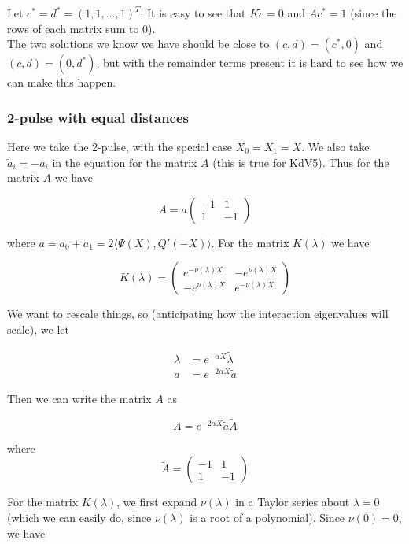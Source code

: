 \documentclass[12pt]{article}
\begin{document}
Let $c^* = d^* = (1, 1, \dots, 1)^T$. It is easy to see that $K \tilde{c} = 0$ and $A c^* = 1$ (since the rows of each matrix sum to 0).\\

The two solutions we know we have should be close to $(c, d) = (c^*, 0)$ and $(c, d) = (0, d^*)$, but with the remainder terms present it is hard to see how we can make this happen.

\subsubsection{2-pulse with equal distances}

Here we take the 2-pulse, with the special case $X_0 = X_1 = X$. We also take $\tilde{a}_i = -a_i$ in the equation for the matrix $A$ (this is true for KdV5). Thus for the matrix $A$ we have

\[
A = a \begin{pmatrix}
-1 & 1 \\
1 & -1
\end{pmatrix}
\]

where $a = a_0 + a_1 = 2 \langle \Psi(X), Q'(-X) \rangle$. For the matrix $K(\lambda)$ we have

\begin{equation}
K(\lambda) = 
\begin{pmatrix}
e^{-\nu(\lambda)X} & -e^{\nu(\lambda)X} \\
-e^{\nu(\lambda)X} & e^{-\nu(\lambda)X}
\end{pmatrix}
\end{equation}

We want to rescale things, so (anticipating how the interaction eigenvalues will scale), we let

\begin{align*}
\lambda &= e^{-\alpha X} \tilde{\lambda} \\
a &= e^{-2 \alpha X} \tilde{a}
\end{align*}

Then we can write the matrix $A$ as 

\[
A = e^{-2\alpha X} \tilde{a} \tilde{A}
\]

where
\[
\tilde{A} = \begin{pmatrix}
-1 & 1 \\
1 & -1
\end{pmatrix}
\]

For the matrix $K(\lambda)$, we first expand $\nu(\lambda)$ in a Taylor series about $\lambda = 0$ (which we can easily do, since $\nu(\lambda)$ is a root of a polynomial). Since $\nu(0) = 0$, we have
\end{document}

